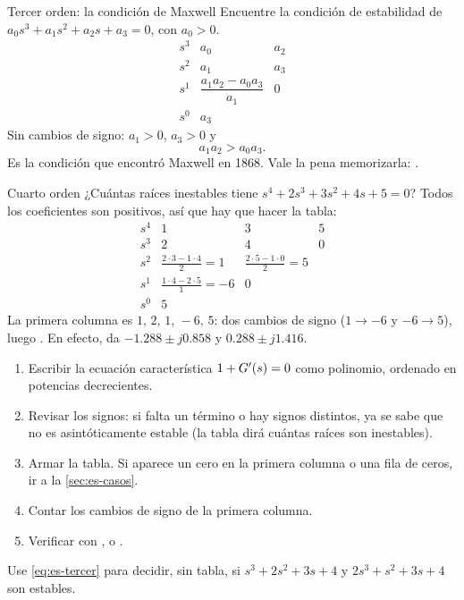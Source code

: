 \begin{ejemplo}[label=ej:es-tercer]{Tercer orden: la condición de Maxwell}
Encuentre la condición de estabilidad de $a_0s^3+a_1s^2+a_2s+a_3=0$, con $a_0>0$.
\solucion
\[
\begin{array}{c|cc}
  s^3 & a_0 & a_2\\
  s^2 & a_1 & a_3\\
  s^1 & \dfrac{a_1a_2-a_0a_3}{a_1} & 0\\
  s^0 & a_3
\end{array}
\]
Sin cambios de signo: $a_1>0$, $a_3>0$ y
\begin{equation}
  a_1a_2>a_0a_3 .
  \label{eq:es-tercer}
\end{equation}
Es la condición que encontró Maxwell en 1868. Vale la pena memorizarla: .
\end{ejemplo}

\begin{ejemplo}[label=ej:es-cuarto]{Cuarto orden}
¿Cuántas raíces inestables tiene $s^4+2s^3+3s^2+4s+5=0$?
\solucion Todos los coeficientes son positivos, así que hay que hacer la tabla:
\[
\begin{array}{c|ccc}
  s^4 & 1 & 3 & 5\\
  s^3 & 2 & 4 & 0\\
  s^2 & \frac{2\cdot3-1\cdot4}{2}=1 & \frac{2\cdot5-1\cdot0}{2}=5\\
  s^1 & \frac{1\cdot4-2\cdot5}{1}=-6 & 0\\
  s^0 & 5
\end{array}
\]
La primera columna es $1,\,2,\,1,\,-6,\,5$: dos cambios de signo ($1\to-6$ y $-6\to5$), luego . En efecto,  da $-1.288\pm j0.858$ y $0.288\pm j1.416$.
\end{ejemplo}


\begin{receta}
\begin{enumerate}
  \item Escribir la ecuación característica $1+G'(s)=0$ como polinomio, ordenado en potencias decrecientes.
  \item Revisar los signos: si falta un término o hay signos distintos, ya se sabe que no es asintóticamente estable (la tabla dirá cuántas raíces son inestables).
  \item Armar la tabla. Si aparece un cero en la primera columna o una fila de ceros, ir a la \cref{sec:es-casos}.
  \item Contar los cambios de signo de la primera columna.
  \item Verificar con ,  o .
\end{enumerate}
\end{receta}

\begin{pausa}
Use \eqref{eq:es-tercer} para decidir, sin tabla, si $s^3+2s^2+3s+4$ y $2s^3+s^2+3s+4$ son estables.
\end{pausa}
